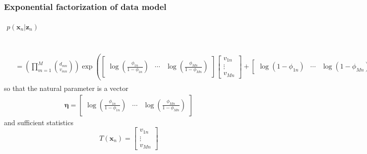 \documentclass[11pt]{article}
\newcommand{\bx}{\ensuremath{\mathbf{x}}}
\newcommand{\bz}{\ensuremath{\mathbf{z}}}
\begin{document}
\subsubsection{Exponential factorization of data model}
\vspace{-0.5cm}
\begin{align}
p(\bx_n | \bz_n) &= \prod\limits_{m=1}^M \mathrm{Bin}(v_{mn}, \phi_{mn}; d_{mn}) \nonumber \\
				 &= \prod\limits_{m=1}^M \exp\left(v_{mn} \log\left(\frac{\phi_{mn}}{1 - \phi_{mn}}\right) + d_{mn} \log(1 - \phi_{mn}) \right) \nonumber \\
				 \begin{split}
				&= \left( \prod\limits_{m=1}^M \binom{d_{mn}}{v_{mn}} \right)
				\exp\left( 
\begin{bmatrix}
         \log\left(\frac{\phi_{1n}}{1 - \phi_{1n}}\right) & \cdots & \log\left(\frac{\phi_{Mn}}{1 - \phi_{Mn}}\right)
        \end{bmatrix}\begin{bmatrix}
         v_{1n} \\ \vdots \\ v_{Mn}
        \end{bmatrix}  +
\begin{bmatrix}
         \log\left(1 - \phi_{1n}\right) & \cdots & \log\left(1 - \phi_{Mn}\right)
        \end{bmatrix}      
                \begin{bmatrix}
         d_{1n} \\ \vdots \\ d_{Mn}
        \end{bmatrix} 
        \right)
        \end{split}
\end{align}
so that the natural parameter is a vector
\begin{align}
\bm{\eta} = \begin{bmatrix}
         \log\left(\frac{\phi_{1n}}{1 - \phi_{1n}}\right) & \cdots & \log\left(\frac{\phi_{Mn}}{1 - \phi_{Mn}}\right)
        \end{bmatrix}
\end{align}
and sufficient statistics 
\[
T(\bx_n) = 
 \begin{bmatrix}
         v_{1n} \\ \vdots \\ v_{Mn}
        \end{bmatrix}
\]
\end{document}
